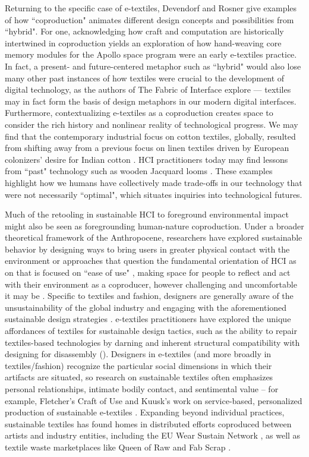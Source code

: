 Returning to the specific case of e-textiles, Devendorf and Rosner give examples of how ``coproduction" animates different design concepts and possibilities from ``hybrid". For one, acknowledging how craft and computation are historically intertwined in coproduction yields an exploration of how hand-weaving core memory modules for the Apollo space program were an early e-textiles practice. In fact, a present- and future-centered metaphor such as ``hybrid" would also lose many other past instances of how textiles were crucial to the development of digital technology, as the authors of The Fabric of Interface \todo{[95]} explore --- textiles may in fact form the basis of design metaphors in our modern digital interfaces. Furthermore, contextualizing e-textiles as a coproduction creates space to consider the rich history and nonlinear reality of technological progress. We may find that the contemporary industrial focus on cotton textiles, globally, resulted from shifting away from a previous focus on linen textiles driven by European colonizers' desire for Indian cotton \todo{[13,135]}. HCI practitioners today may find lessons from ``past" technology such as wooden Jacquard looms \todo{[47]}. These examples highlight how we humans have collectively made trade-offs in our technology that were not necessarily ``optimal", which situates inquiries into technological futures.

Much of the retooling in sustainable HCI to foreground environmental impact might also be seen as foregrounding human-nature coproduction. Under a broader theoretical framework of the Anthropocene, researchers have explored sustainable behavior by designing ways to bring users in greater physical contact with the environment \todo{[77,82,85]} or approaches that question the fundamental orientation of HCI as on that is focused on ``ease of use" \todo{[82]}, making space for people to reflect and act with their environment as a coproducer, however challenging and uncomfortable it may be \todo{[35,81,86]}. Specific to textiles and fashion, designers are generally aware of the unsustainability of the global industry and engaging with the aforementioned sustainable design strategies \todo{[23,75,140]}. e-textiles practitioners have explored the unique affordances of textiles for sustainable design tactics, such as the ability to repair textiles-based technologies by darning \todo{[68]} and inherent structural compatibility with designing for disassembly (). Designers in e-textiles (and more broadly in textiles/fashion) recognize the particular social dimensions in which their artifacts are situated, so research on sustainable textiles often emphasizes personal relationships, intimate bodily contact, and sentimental value -- for example, Fletcher's Craft of Use \todo{[49]} and Kuusk's work on service-based, personalized production of sustainable e-textiles \todo{[76]}. Expanding beyond individual practices, sustainable textiles has found homes in distributed efforts coproduced between artists and industry entities, including the EU Wear Sustain Network \todo{[55]}, as well as textile waste marketplaces like Queen of Raw \todo{[156]} and Fab Scrap \todo{[157]}.

